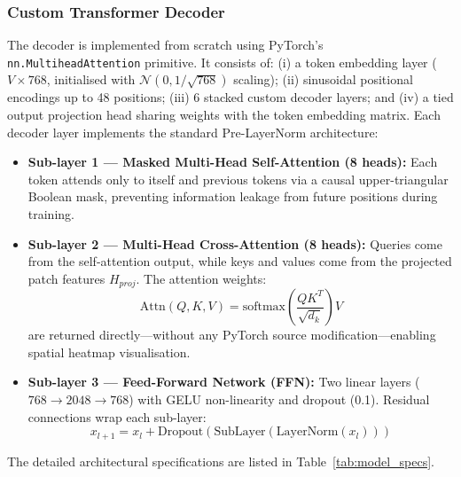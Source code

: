 \documentclass[conference]{IEEEtran}
\begin{document}
\subsubsection{Custom Transformer Decoder}
The decoder is implemented from scratch using PyTorch's \texttt{nn.MultiheadAttention} primitive. It consists of: (i) a token embedding layer ($V \times 768$, initialised with $\mathcal{N}(0, 1/\sqrt{768})$ scaling); (ii) sinusoidal positional encodings up to 48 positions; (iii) 6 stacked custom decoder layers; and (iv) a tied output projection head sharing weights with the token embedding matrix. Each decoder layer implements the standard Pre-LayerNorm architecture:
\begin{itemize}
    \item \textbf{Sub-layer 1 --- Masked Multi-Head Self-Attention (8 heads):} Each token attends only to itself and previous tokens via a causal upper-triangular Boolean mask, preventing information leakage from future positions during training.
    \item \textbf{Sub-layer 2 --- Multi-Head Cross-Attention (8 heads):} Queries come from the self-attention output, while keys and values come from the projected patch features $H_{proj}$. The attention weights:
    \begin{equation}
        \text{Attn}(Q, K, V) = \text{softmax}\left(\frac{QK^T}{\sqrt{d_k}}\right)V
    \end{equation}
    are returned directly---without any PyTorch source modification---enabling spatial heatmap visualisation.
    \item \textbf{Sub-layer 3 --- Feed-Forward Network (FFN):} Two linear layers ($768 \rightarrow 2048 \rightarrow 768$) with GELU non-linearity and dropout (0.1). Residual connections wrap each sub-layer:
    \begin{equation}
        x_{l+1} = x_l + \text{Dropout}(\text{SubLayer}(\text{LayerNorm}(x_l)))
    \end{equation}
\end{itemize}

The detailed architectural specifications are listed in Table~\ref{tab:model_specs}.
\end{document}
